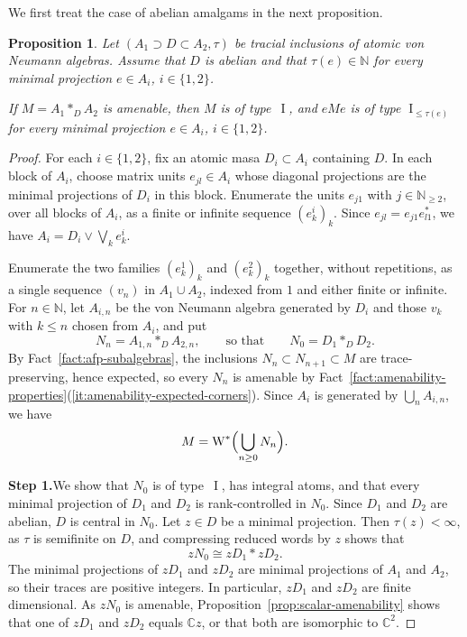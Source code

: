 \documentclass[11pt]{amsart}
\numberwithin{equation}{section}
\newcommand{\nn}{\mathbb N}
\newcommand{\cc}{\mathbb C}
\DeclareMathOperator{\I}{I}
\newcommand{\Wstar}{\operatorname{W}^*}
\newtheorem{Prop}[The]{Proposition}
\theoremstyle{definition}
\begin{document}
We first treat the case of abelian amalgams in the next proposition. 

\begin{Prop}
    \label{prop:abelian-amalgam}
    Let $(A_1\supset D\subset A_2,\tau)$ be tracial inclusions of atomic von Neumann algebras. Assume that $D$ is abelian and that $\tau(e)\in\nn$ for every minimal projection $e\in A_i$, $i\in\{1,2\}$. 
    
    If $M=A_1\ast_D A_2$ is amenable, then $M$ is of type~$\I$, and $eMe$ is of type $\I_{\leq\tau(e)}$ for every minimal projection $e\in A_i$, $i\in\{1,2\}$.
\end{Prop}

\begin{proof}
    For each $i\in\{1,2\}$, fix an atomic masa $D_i\subset A_i$ containing $D$. 
    In each block of $A_i$, choose matrix units $e_{jl}\in A_i$ whose diagonal projections are the minimal projections of $D_i$ in this block. Enumerate the units $e_{j1}$ with $j\in\nn_{\geq2}$, over all blocks of $A_i$, as a finite or infinite sequence $(e^i_k)_k$. Since $e_{jl}=e_{j1}e_{l1}^*$, we have $A_i=D_i\vee\bigvee_k e^i_k$.

    Enumerate the two families $(e^1_k)_k$ and $(e^2_k)_k$ together, without repetitions, as a single sequence $(v_n)$ in $A_1\cup A_2$, indexed from $1$ and either finite or infinite. For $n\in\nn$, let $A_{i,n}$ be the von Neumann algebra generated by $D_i$ and those $v_k$ with $k\leq n$ chosen from $A_i$, and put
    $$
        N_n=A_{1,n}\ast_D A_{2,n},\qquad\text{so that}\qquad
        N_0=D_1\ast_D D_2.
    $$
    By Fact~\ref{fact:afp-subalgebras}, the inclusions $N_n\subset N_{n+1}\subset M$ are trace-preserving, hence expected, so every $N_n$ is amenable by Fact~\ref{fact:amenability-properties}\textup{(\ref*{it:amenability-expected-corners})}. Since $A_i$ is generated by $\bigcup_nA_{i,n}$, we have
    \begin{equation}\label{eq:dense-exhaustion}
        M=\Wstar\Bigl(\bigcup_{n\geq0}N_n\Bigr).
    \end{equation}

    \smallskip
    \noindent\textbf{Step 1.}\enspace We show that $N_0$ is of type~$\I$, has integral atoms, and that every minimal projection of $D_1$ and $D_2$ is rank-controlled in $N_0$. Since $D_1$ and $D_2$ are abelian, $D$ is central in $N_0$. Let $z\in D$ be a minimal projection. Then $\tau(z)<\infty$, as $\tau$ is semifinite on $D$, and compressing reduced words by $z$ shows that
    $$
        zN_0\cong zD_1\ast zD_2.
    $$
    The minimal projections of $zD_1$ and $zD_2$ are minimal projections of $A_1$ and $A_2$, so their traces are positive integers. In particular, $zD_1$ and $zD_2$ are finite dimensional. As $zN_0$ is amenable, Proposition~\ref{prop:scalar-amenability} shows that one of $zD_1$ and $zD_2$ equals $\cc z$, or that both are isomorphic to $\cc^2$.


\end{proof}
\end{document}
